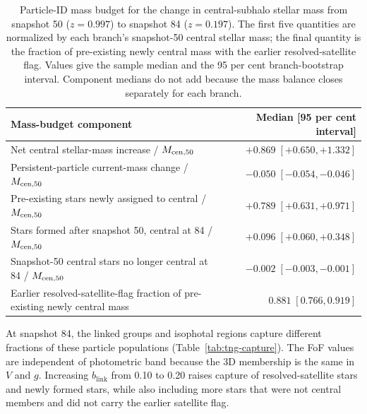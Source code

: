 \documentclass[usenatbib]{mnras}
\begin{document}
\begin{table}
\centering
\caption{Particle-ID mass budget for the change in central-subhalo stellar mass
from snapshot 50 ($z=0.997$) to snapshot 84 ($z=0.197$). The first five
quantities are normalized by each branch's snapshot-50 central stellar mass;
the final quantity is the fraction of pre-existing newly central mass with
the earlier resolved-satellite flag. Values give the sample median and the
95 per cent branch-bootstrap interval. Component medians do not add because
the mass balance closes separately for each branch.}
\label{tab:tng-id-budget}
\small
\begin{tabular}{lr}
\toprule
Mass-budget component & Median [95 per cent interval] \\
\midrule
Net central stellar-mass increase / $M_{\rm cen,50}$ & $+0.869\;[+0.650,+1.332]$ \\
Persistent-particle current-mass change / $M_{\rm cen,50}$ & $-0.050\;[-0.054,-0.046]$ \\
Pre-existing stars newly assigned to central / $M_{\rm cen,50}$ & $+0.789\;[+0.631,+0.971]$ \\
Stars formed after snapshot 50, central at 84 / $M_{\rm cen,50}$ & $+0.096\;[+0.060,+0.348]$ \\
Snapshot-50 central stars no longer central at 84 / $M_{\rm cen,50}$ & $-0.002\;[-0.003,-0.001]$ \\
Earlier resolved-satellite-flag fraction of pre-existing newly central mass & $0.881\;[0.766,0.919]$ \\
\bottomrule
\end{tabular}
\end{table}

At snapshot 84, the linked groups and isophotal regions capture different
fractions of these particle populations (Table~\ref{tab:tng-capture}). The
FoF values are independent of photometric band because the 3D membership is
the same in $V$ and $g$. Increasing $b_{\mathrm{link}}$ from 0.10 to 0.20
raises capture of resolved-satellite stars and newly formed stars, while
also including more stars that were not central members and did not carry the
earlier satellite flag.
\end{document}
